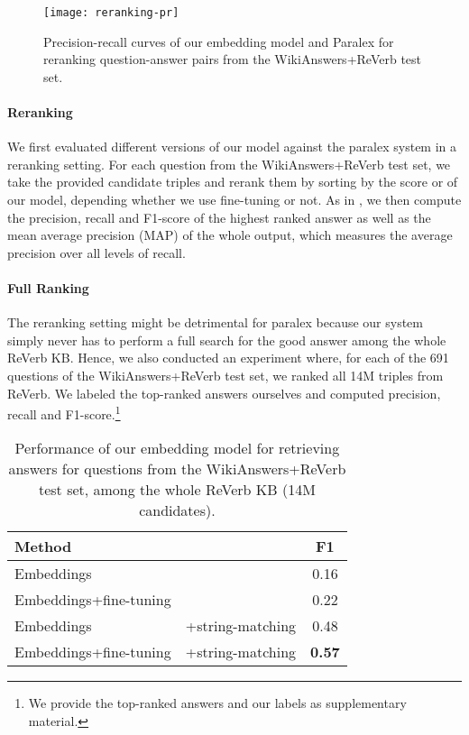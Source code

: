 \documentclass[runningheads,a4paper]{llncs}
\newcommand{\rv}{{\sc ReVerb}\xspace}
\newcommand{\wkrv}{{\sc WikiAnswers+ReVerb}\xspace}
\begin{document}
\begin{figure}[t]
\begin{center}
\centerline{\texttt{[image: reranking-pr]}}
\caption{Precision-recall curves of our embedding model and Paralex \cite{paralex} for reranking question-answer pairs from the \wkrv test set.}
\label{fig:pr}
\end{center}
\vskip -0.2in
\end{figure} 

\paragraph{Reranking}

We first evaluated different versions of our model against the {\sc paralex} system in a reranking setting.  
For each question  from the \wkrv test set, we take the provided candidate triples  and rerank them by sorting by the score  or  of our model, depending whether we use fine-tuning or not. 
As in \cite{paralex}, we then compute the precision, recall and F1-score of the highest ranked answer as well as the mean average precision (MAP) of the whole output, which measures the average precision over all levels of recall.


\paragraph{Full Ranking}

The reranking setting might be detrimental for {\sc paralex} because our system simply never has to perform a full search for the good answer among the whole \rv KB.
Hence, we also conducted an experiment where, for each of the 691 questions of the \wkrv test set, we ranked all 14M triples from \rv.
We labeled the top-ranked answers ourselves and computed precision, recall and F1-score.\footnote{We provide the top-ranked answers and our labels as supplementary material.}



\begin{table}
\caption{Performance of our embedding model for retrieving answers for questions from the \wkrv test set, among the whole \rv KB (14M candidates).}
\label{tab:resfull}
\vskip -0.1in
\begin{center}
\begin{small}
\begin{tabular}{|l@{}l|c|}
\hline
{\bf Method} && {\bf F1} \\
\hline
Embeddings && 0.16  \\
Embeddings+fine-tuning && 0.22 \\
\hline
Embeddings &+string-matching & 0.48 \\
Embeddings+fine-tuning &+string-matching &  {\bf 0.57} \\
\hline
\end{tabular}
\end{small}
\end{center}
\vskip -0.1in
\end{table}
\end{document}
